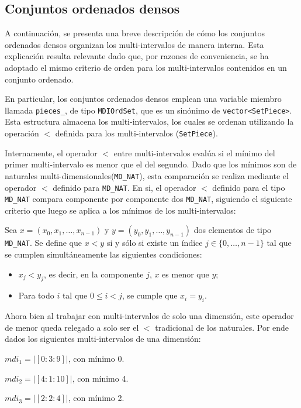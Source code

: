 \subsection{Conjuntos ordenados densos}\label{sec:conjs-ord-dense}

A continuación, se presenta una breve descripción de cómo los conjuntos ordenados densos organizan los multi-intervalos de manera interna. Esta explicación resulta relevante dado que, por razones de conveniencia, se ha adoptado el mismo criterio de orden para los multi-intervalos contenidos en un conjunto ordenado.

En particular, los conjuntos ordenados densos emplean una variable miembro llamada \texttt{pieces\_}, de tipo \texttt{MDIOrdSet}, que es un sinónimo de \texttt{vector<SetPiece>}. Esta estructura almacena los multi-intervalos, los cuales se ordenan utilizando la operación $<$ definida para los multi-intervalos (\texttt{SetPiece}).

Internamente, el operador $<$ entre multi-intervalos evalúa si el mínimo del primer multi-intervalo es menor que el del segundo. Dado que los mínimos son de naturales multi-dimensionales(\texttt{MD\_NAT}), esta comparación se realiza mediante el operador $<$ definido para \texttt{MD\_NAT}. En si, el operador $<$ definido para el tipo \texttt{MD\_NAT} compara componente por componente dos \texttt{MD\_NAT}, siguiendo el siguiente criterio que luego se aplica a los mínimos de los multi-intervalos: 

\begin{center}
Sea $x = (x_0, x_1, \dots, x_{n-1})$ y $y = (y_0, y_1, \dots, y_{n-1})$ dos elementos de tipo \texttt{MD\_NAT}. Se define que $x < y$ si y sólo si existe un índice $j \in \{0, \dots, {n-1}\}$ tal que se cumplen simultáneamente las siguientes condiciones:
\end{center}

\begin{itemize}
    \item $x_j < y_j$, es decir, en la componente $j$, $x$ es menor que $y$;
    \item Para todo $i$ tal que $0 \leq i < j$, se cumple que $x_i = y_i$.
\end{itemize}

Ahora bien al trabajar con multi-intervalos de solo una dimensión, este operador de menor queda relegado a solo ser el $<$ tradicional de los naturales. Por ende dados los siguientes multi-intervalos de una dimensión:

\begin{center}
    
    $mdi_1 = |[0:3:9]|$, con mínimo 0.
    
    $mdi_2 = |[4:1:10]|$, con mínimo 4.
    
    $mdi_3 = |[2:2:4]|$, con mínimo 2.
    
\end{center}


